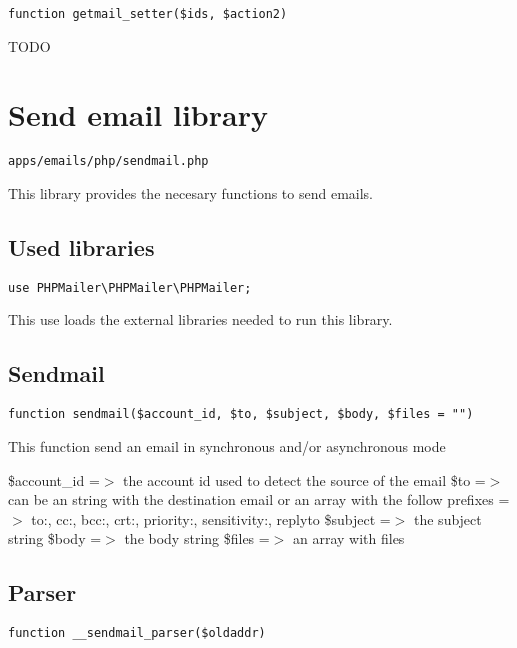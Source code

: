 \documentclass[a4paper]{book}
\begin{document}
\begin{lstlisting}
function getmail_setter($ids, $action2)
\end{lstlisting}

TODO

\hypertarget{toc65}{}
\section{Send email library}

\begin{lstlisting}
apps/emails/php/sendmail.php
\end{lstlisting}

This library provides the necesary functions to send emails.

\hypertarget{toc66}{}
\subsection{Used libraries}

\begin{lstlisting}
use PHPMailer\PHPMailer\PHPMailer;
\end{lstlisting}

This use loads the external libraries needed to run this library.

\hypertarget{toc67}{}
\subsection{Sendmail}

\begin{lstlisting}
function sendmail($account_id, $to, $subject, $body, $files = "")
\end{lstlisting}

This function send an email in synchronous and/or asynchronous mode

\$account\_id =$>$ the account id used to detect the source of the email
\$to         =$>$ can be an string with the destination email or an array with
               the follow prefixes =$>$ to:, cc:, bcc:, crt:, priority:,
               sensitivity:, replyto
\$subject    =$>$ the subject string
\$body       =$>$ the body string
\$files      =$>$ an array with files

\hypertarget{toc68}{}
\subsection{Parser}

\begin{lstlisting}
function __sendmail_parser($oldaddr)
\end{lstlisting}
\end{document}
